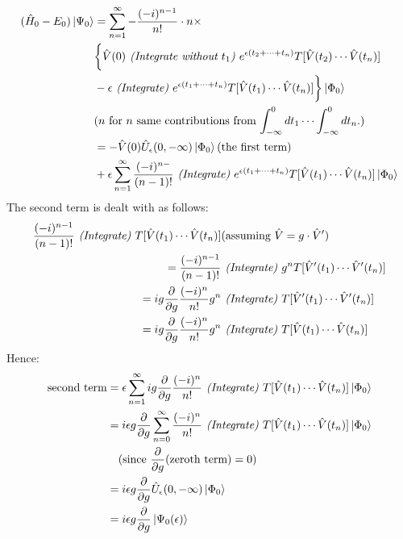 \documentclass{article}
\numberwithin{equation}{subsection} %
\begin{document}
\begin{align}
(\hat{H}_0-E_0)\ket{\Psi_0} &= 
\sum_{n=1}^{\infty} - \frac{(-i)^{n-1}}{n!} \cdot n \times \nonumber \\
&\bigg\{
\hat{V}(0) \text{\textit{ (Integrate without $t_1$) }}
e^{\epsilon(t_2+\dotsb+t_n)}
T[\hat{V}(t_2)\dotsb \hat{V}(t_n)] \nonumber\\
&-
\epsilon
\text{\textit{ (Integrate) }}
e^{\epsilon(t_1+\dotsb+t_n)}
T[\hat{V}(t_1)\dotsb \hat{V}(t_n)]	
\bigg\}
\ket{\Phi_0}  \nonumber \\
&\text{($n$ for $n$ same contributions from 
	$\int_{-\infty}^{0} dt_1 \dotsb \int_{-\infty}^{0} dt_n$.)} \nonumber\\
&= -\hat{V}(0)\hat{U}_\epsilon(0,-\infty) \ket{\Phi_0}
\text{(the first term)} \nonumber\\
&+ \epsilon \sum_{n=1}^{\infty} \frac{(-i)^{n-}}{(n-1)!}
\text{\textit{ (Integrate) }}
e^{\epsilon(t_1+\dotsb+t_n)}
T[\hat{V}(t_1)\dotsb \hat{V}(t_n)] \ket{\Phi_0} \nonumber
\end{align}
The second term is dealt with as follows:
\begin{align}
\frac{(-i)^{n-1}}{(n-1)!} \text{\textit{ (Integrate) }} 
T[\hat{V}(t_1)\dotsb \hat{V}(t_n)] & 
\text{(assuming $\hat{V} = g\cdot \hat{V}')$} \nonumber\\
= \frac{(-i)^{n-1}}{(n-1)!} &\text{\textit{ (Integrate) }}
g^n T[\hat{V}'(t_1)\dotsb \hat{V}'(t_n)] \nonumber \\
=ig\frac{\partial}{\partial g} \frac{(-i)^n}{n!}g^n
&\text{\textit{ (Integrate) }} T[\hat{V}'(t_1)\dotsb \hat{V}'(t_n)]
\nonumber \\
=ig\frac{\partial}{\partial g} \frac{(-i)^n}{n!}g^n
&\text{\textit{ (Integrate) }} T[\hat{V}(t_1)\dotsb \hat{V}(t_n)]\nonumber
\end{align}
Hence:
\begin{align}
\text{second term} &= \epsilon
\sum_{n=1}^{\infty}ig \frac{\partial}{\partial g}
\frac{(-i)^n}{n!}
\text{\textit{ (Integrate) }} T[\hat{V}(t_1)\dotsb \hat{V}(t_n)] \ket{\Phi_0} \nonumber\\
&= i\epsilon g \frac{\partial}{\partial g}
\sum_{n=0}^{\infty}
\frac{(-i)^n}{n!}
\text{\textit{ (Integrate) }} T[\hat{V}(t_1)\dotsb \hat{V}(t_n)] \ket{\Phi_0} \nonumber\\
&\text{\quad(since $\frac{\partial}{\partial g}
	\text{(zeroth term)}=0$)} \nonumber\\
&=i\epsilon g \frac{\partial}{\partial g}
\hat{U}_\epsilon(0,-\infty) \ket{\Phi_0} \nonumber\\
&= i\epsilon g \frac{\partial}{\partial g} \ket{\Psi_0(\epsilon)}
\nonumber
\end{align}
\end{document}
